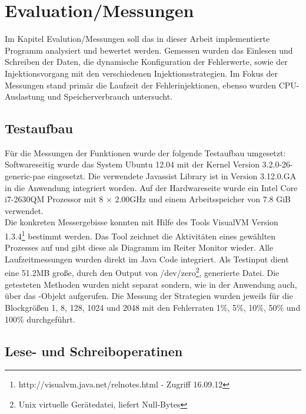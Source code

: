 \chapter{Evaluation/Messungen}\vspace{1cm}
\label{chp:eval}



Im Kapitel Evalution/Messungen soll das in dieser Arbeit implementierte Programm analysiert und bewertet werden. Gemessen wurden das Einlesen und Schreiben der Daten, die dynamische Konfiguration der Fehlerwerte, sowie der Injektionsvorgang mit den verschiedenen Injektionsstrategien. Im Fokus der Messungen stand prim\"ar die Laufzeit der Fehlerinjektionen, ebenso wurden CPU-Auslastung und Speicherverbrauch untersucht. 

\section{Testaufbau} 
F\"ur die Messungen der Funktionen wurde der folgende Testaufbau umgesetzt: Softwareseitig wurde das System Ubuntu 12.04 mit der Kernel Version 3.2.0-26-generic-pae eingesetzt. Die verwendete Javassist Library ist in Version 3.12.0.GA in die Anwendung integriert worden. Auf der Hardwareseite wurde ein Intel Core i7-2630QM Prozessor mit 8 $\times$ 2.00GHz und einem Arbeitsspeicher von 7.8 GiB verwendet.\\
Die konkreten Messergebisse konnten mit Hilfe des Tools VisualVM Version 1.3.4\footnote{http://visualvm.java.net/relnotes.html - Zugriff 16.09.12} bestimmt werden. Das Tool zeichnet die Aktivit\"aten eines gew\"ahlten Prozesses auf und gibt diese als Diagramm im Reiter Monitor wieder. Alle Laufzeitmessungen wurden direkt im Java Code integriert. Als Testinput dient eine 51.2MB gro\ss e, durch den Output von /dev/zero\footnote{Unix virtuelle Gerätedatei, liefert Null-Bytes}, generierte Datei. Die getesteten Methoden wurden nicht separat sondern, wie in der Anwendung auch, \"uber das -Objekt aufgerufen. Die Messung der Strategien wurden jeweils f\"ur die Blockgr\"o\ss en 1, 8, 128, 1024 und 2048 mit den Fehlerraten 1\%, 5\%, 10\%, 50\% und 100\% durchgef\"uhrt.

\section{Lese- und Schreiboperatinen}

